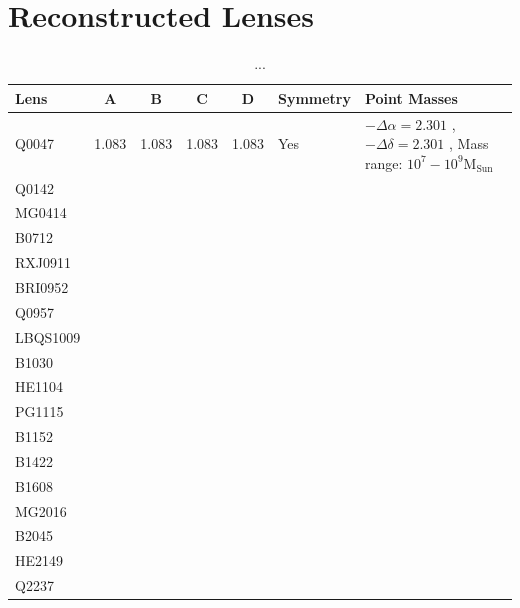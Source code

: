 \documentclass[useAMS,usenatbib]{mn2e}
\begin{document}



\appendix
\section{Reconstructed Lenses}\label{sec:reconstructions}

\begin{table}
 \begin{center}
  \begin{tabular}{l c c c c l l}
   Lens & A & B & C & D & Symmetry & Point Masses\\ \hline \hline
   Q0047 & 1.083 & 1.083 & 1.083 & 1.083 & Yes & $-\Delta\alpha = 2.301$ , $-\Delta\delta = 2.301$ , Mass range: $10^{7}-10^{9} \mathrm{M_{Sun}}$\\
   Q0142 & & & & & & \\
   MG0414 & & & & & & \\
   B0712 & & & & & & \\
   RXJ0911 & & & & & & \\
   BRI0952 & & & & & & \\
   Q0957 & & & & & & \\
   LBQS1009 & & & & & & \\
   B1030 & & & & & & \\
   HE1104 & & & & & & \\
   PG1115 & & & & & \\
   B1152 & & & & & \\
   B1422 & & & & & \\
   B1608 & & & & & \\
   MG2016 & & & & & \\
   B2045 & & & & & \\
   HE2149 & & & & & \\
   Q2237 & & & & & \\
  \end{tabular}
  \caption{...}
  \label{tab:lensparameters}
 \end{center}
\end{table}
\end{document}
